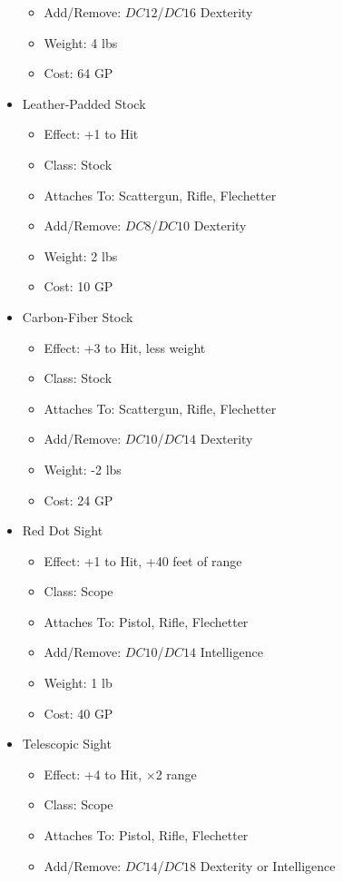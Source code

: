 \documentclass[12pt, twoside]{article}
\begin{document}
\begin{FlushLeft}
\begin{multicols}{2}
\begin{itemize}[wide]
\begin{itemize}
					\item Add/Remove: $DC12$/$DC16$ Dexterity
					\item Weight: 4 lbs
					\item Cost: 64 GP
				\end{itemize}
				\vfill \null \columnbreak
				\item Leather-Padded Stock
				\begin{itemize}
					\item Effect: +1 to Hit
					\item Class: Stock
					\item Attaches To: Scattergun, Rifle, Flechetter
					\item Add/Remove: $DC8$/$DC10$ Dexterity
					\item Weight: 2 lbs
					\item Cost: 10 GP
				\end{itemize}
				\item Carbon-Fiber Stock
				\begin{itemize}
					\item Effect: +3 to Hit, less weight
					\item Class: Stock
					\item Attaches To: Scattergun, Rifle, Flechetter
					\item Add/Remove: $DC10$/$DC14$ Dexterity
					\item Weight: -2 lbs
					\item Cost: 24 GP
				\end{itemize}
				\item Red Dot Sight
				\begin{itemize}
					\item Effect: +1 to Hit, +40 feet of range
					\item Class: Scope
					\item Attaches To: Pistol, Rifle, Flechetter
					\item Add/Remove: $DC10$/$DC14$ Intelligence
					\item Weight: 1 lb
					\item Cost: 40 GP
				\end{itemize}
				\item Telescopic Sight
				\begin{itemize}
					\item Effect: +4 to Hit, $\times$2 range
					\item Class: Scope
					\item Attaches To: Pistol, Rifle, Flechetter
					\item Add/Remove: $DC14$/$DC18$ Dexterity or Intelligence

\end{itemize}
\end{itemize}
\end{multicols}
\end{FlushLeft}
\end{document}
